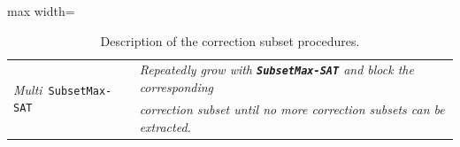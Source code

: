 \documentclass[twoside,11pt]{article}
\newcommand\comment[1]{\marginpar{\tiny #1}}
\renewcommand\comment[1]{#1}
\newcommand{\tias}[1]{{\comment{\color{blue}Tias:#1}}}
\newcommand{\emilio}[1]{{\comment{\color{red}Emilio: #1}}}
\newcommand\mm[1]{\ensuremath{#1}\xspace}
\newcommand\call[1]{\mm{\texttt{#1}}}
\newcommand\sat{\texttt{{SAT}}\xspace}
\newcommand\subsetmaxsat{\texttt{SubsetMax-SAT}}
\newcommand\grow{\mm{\call{Grow}}}
\newcommand\maxsat{\texttt{MaxSAT}}
\begin{document}
\begin{table}[!h]
\begin{adjustbox}{max width=\textwidth}
\begin{tabular}{|l|l|}
			\multirow{2}{*}{\emph{Multi}~\subsetmaxsat} &	\textit{Repeatedly grow with \textbf{\emph{\subsetmaxsat}}  and block the corresponding}\\ 
			& \textit{correction subset until no more correction subsets can be extracted.}\\\hline
		\end{tabular}
	\end{adjustbox}
	\caption{Description of the correction subset procedures.}
	
	\label{tab:correction-subset-proc-description}
\end{table}
\end{document}
